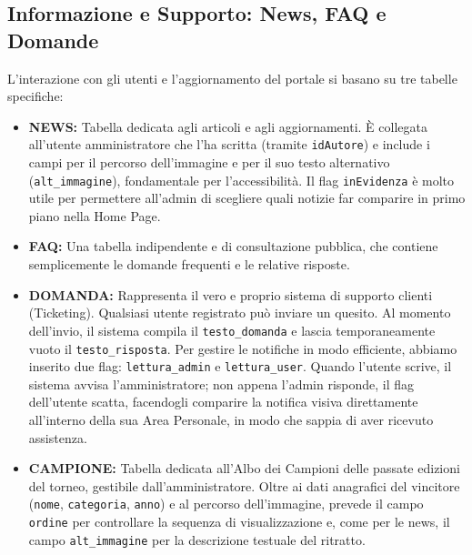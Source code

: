 \documentclass[11pt,a4paper]{article}
\begin{document}
\subsection{Informazione e Supporto: News, FAQ e Domande}
L'interazione con gli utenti e l'aggiornamento del portale si basano su tre tabelle specifiche:

\begin{itemize}
    \item \textbf{NEWS:} Tabella dedicata agli articoli e agli aggiornamenti. È collegata all'utente amministratore che l'ha scritta (tramite \texttt{idAutore}) e include i campi per il percorso dell'immagine e per il suo testo alternativo (\texttt{alt\_immagine}), fondamentale per l'accessibilità. Il flag \texttt{inEvidenza} è molto utile per permettere all'admin di scegliere quali notizie far comparire in primo piano nella Home Page.
    \item \textbf{FAQ:} Una tabella indipendente e di consultazione pubblica, che contiene semplicemente le domande frequenti e le relative risposte.
    \item \textbf{DOMANDA:} Rappresenta il vero e proprio sistema di supporto clienti (Ticketing). Qualsiasi utente registrato può inviare un quesito. Al momento dell'invio, il sistema compila il \texttt{testo\_domanda} e lascia temporaneamente vuoto il \texttt{testo\_risposta}. Per gestire le notifiche in modo efficiente, abbiamo inserito due flag: \texttt{lettura\_admin} e \texttt{lettura\_user}. Quando l'utente scrive, il sistema avvisa l'amministratore; non appena l'admin risponde, il flag dell'utente scatta, facendogli comparire la notifica visiva direttamente all'interno della sua Area Personale, in modo che sappia di aver ricevuto assistenza.
    \item \textbf{CAMPIONE:} Tabella dedicata all'Albo dei Campioni delle passate edizioni del torneo, gestibile dall'amministratore. Oltre ai dati anagrafici del vincitore (\texttt{nome}, \texttt{categoria}, \texttt{anno}) e al percorso dell'immagine, prevede il campo \texttt{ordine} per controllare la sequenza di visualizzazione e, come per le news, il campo \texttt{alt\_immagine} per la descrizione testuale del ritratto.
\end{itemize}
\end{document}
